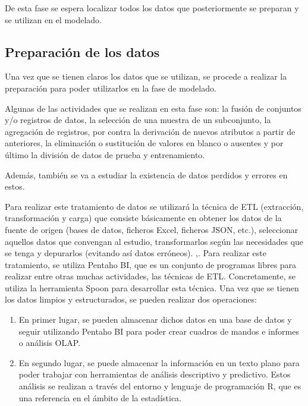 De esta fase se espera localizar todos los datos que posteriormente se preparan y se utilizan en el modelado.

\subsection{Preparación de los datos}
Una vez que se tienen claros los datos que se utilizan, se procede a realizar la preparación para poder utilizarlos en la fase de modelado.

Algunas de las actividades que se realizan en esta fase son: la fusión de conjuntos y/o registros de datos, la selección de una muestra de un subconjunto, la agregación de registros, por contra la derivación de nuevos atributos a partir de anteriores, la eliminación o sustitución de valores en blanco o ausentes y por último la división de datos de prueba y entrenamiento.

Además, también se va a estudiar la existencia de datos perdidos y errores en estos.

Para realizar este tratamiento de datos se utilizará la técnica de ETL (extracción, transformación y carga) que consiste básicamente en obtener los datos de la fuente de origen (bases de datos, ficheros Excel, ficheros JSON, etc.), seleccionar aquellos datos que convengan al estudio, transformarlos según las necesidades que se tenga y depurarlos (evitando así datos erróneos). \cite{prakash2017etl} \cite{matos2006metodologia},\cite{gour2010improve}.
Para realizar este tratamiento, se utiliza Pentaho BI, que es un conjunto de programas libres para realizar entre otras muchas actividades, las técnicas de ETL. Concretamente, se utiliza la herramienta Spoon para desarrollar esta técnica. 
Una vez que se tienen los datos limpios y estructurados, se pueden realizar dos operaciones:

\begin{enumerate}
	\item  En primer lugar, se pueden almacenar dichos datos en una base de datos y seguir utilizando Pentaho BI para poder crear cuadros de mandos e informes o análisis OLAP. 
	
	\item  En segundo lugar, se puede almacenar la información en un texto plano para poder trabajar con herramientas de análisis descriptivo y predictivo. Estos análisis se realizan a través del entorno y lenguaje de programación R, que es una referencia en el ámbito de la estadística.
\end{enumerate}

